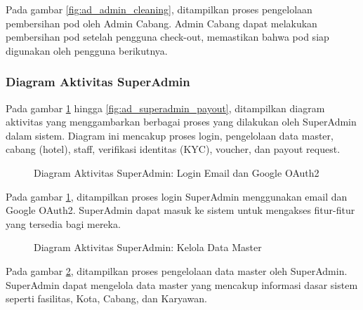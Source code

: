 Pada gambar \ref{fig:ad_admin_cleaning}, ditampilkan proses pengelolaan pembersihan pod oleh Admin Cabang. Admin Cabang dapat melakukan pembersihan pod setelah pengguna check-out, memastikan bahwa pod siap digunakan oleh pengguna berikutnya.

\subsubsection{Diagram Aktivitas SuperAdmin}

Pada gambar \ref{fig:ad_superadmin_login} hingga \ref{fig:ad_superadmin_payout}, ditampilkan diagram aktivitas yang menggambarkan berbagai proses yang dilakukan oleh SuperAdmin dalam sistem. Diagram ini mencakup proses login, pengelolaan data master, cabang (hotel), staff, verifikasi identitas (KYC), voucher, dan payout request.

\begin{figure}[H] %
    \centering
    \caption{Diagram Aktivitas SuperAdmin: Login Email dan Google OAuth2}
    \label{fig:ad_superadmin_login} %
\end{figure}

Pada gambar \ref{fig:ad_superadmin_login}, ditampilkan proses login SuperAdmin menggunakan email dan Google OAuth2. SuperAdmin dapat masuk ke sistem untuk mengakses fitur-fitur yang tersedia bagi mereka.

\begin{figure}[H] %
    \centering
    \caption{Diagram Aktivitas SuperAdmin: Kelola Data Master}
    \label{fig:ad_superadmin_master} %
\end{figure}

Pada gambar \ref{fig:ad_superadmin_master}, ditampilkan proses pengelolaan data master oleh SuperAdmin. SuperAdmin dapat mengelola data master yang mencakup informasi dasar sistem seperti fasilitas, Kota, Cabang, dan Karyawan.

